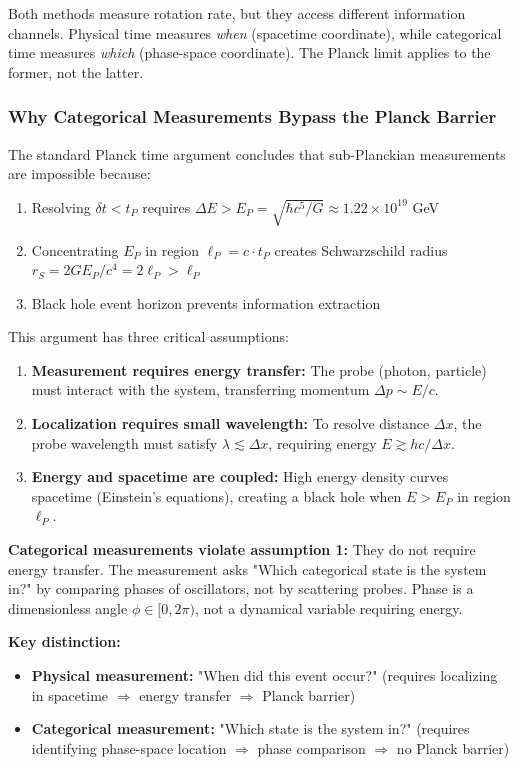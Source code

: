 \documentclass[twocolumn,10pt]{article}
\theoremstyle{remark}
\begin{document}
Both methods measure rotation rate, but they access different information channels. Physical time measures \textit{when} (spacetime coordinate), while categorical time measures \textit{which} (phase-space coordinate). The Planck limit applies to the former, not the latter.

\subsubsection{Why Categorical Measurements Bypass the Planck Barrier}

The standard Planck time argument concludes that sub-Planckian measurements are impossible because:
\begin{enumerate}
    \item Resolving $\delta t < t_P$ requires $\Delta E > E_P = \sqrt{\hbar c^5/G} \approx 1.22 \times 10^{19}$ GeV
    \item Concentrating $E_P$ in region $\ell_P = c \cdot t_P$ creates Schwarzschild radius $r_S = 2GE_P/c^4 = 2\ell_P > \ell_P$
    \item Black hole event horizon prevents information extraction
\end{enumerate}

This argument has three critical assumptions:
\begin{enumerate}
    \item \textbf{Measurement requires energy transfer:} The probe (photon, particle) must interact with the system, transferring momentum $\Delta p \sim E/c$.
    
    \item \textbf{Localization requires small wavelength:} To resolve distance $\Delta x$, the probe wavelength must satisfy $\lambda \lesssim \Delta x$, requiring energy $E \gtrsim hc/\Delta x$.
    
    \item \textbf{Energy and spacetime are coupled:} High energy density curves spacetime (Einstein's equations), creating a black hole when $E > E_P$ in region $\ell_P$.
\end{enumerate}

\textbf{Categorical measurements violate assumption 1:} They do not require energy transfer. The measurement asks "Which categorical state is the system in?" by comparing phases of oscillators, not by scattering probes. Phase is a dimensionless angle $\phi \in [0, 2\pi)$, not a dynamical variable requiring energy.

\textbf{Key distinction:}
\begin{itemize}
    \item \textbf{Physical measurement:} "When did this event occur?" (requires localizing in spacetime $\Rightarrow$ energy transfer $\Rightarrow$ Planck barrier)
    
    \item \textbf{Categorical measurement:} "Which state is the system in?" (requires identifying phase-space location $\Rightarrow$ phase comparison $\Rightarrow$ no Planck barrier)
\end{itemize}
\end{document}
